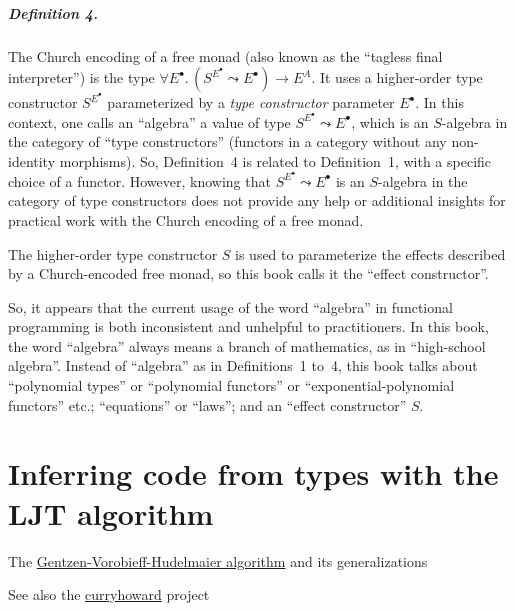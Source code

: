 \paragraph{Definition 4.}

The Church encoding of a free monad (also known as the \textsf{``}tagless
final interpreter\textsf{''}) is the type $\forall E^{\bullet}.\,(S^{E^{\bullet}}\leadsto E^{\bullet})\rightarrow E^{A}$.
It uses a higher-order type constructor $S^{E^{\bullet}}$ parameterized
by a \emph{type constructor} parameter $E^{\bullet}$. In this context,
one calls an \textsf{``}algebra\textsf{''} a value of type $S^{E^{\bullet}}\leadsto E^{\bullet}$,
which is an $S$-algebra in the category of \textsf{``}type constructors\textsf{''}
(functors in a category without any non-identity morphisms). So, Definition~4
is related to Definition~1, with a specific choice of a functor.
However, knowing that $S^{E^{\bullet}}\leadsto E^{\bullet}$ is an
$S$-algebra in the category of type constructors does not provide
any help or additional insights for practical work with the Church
encoding of a free monad.

The higher-order type constructor $S$ is used to parameterize the
effects described by a Church-encoded free monad, so this book calls
it the \textsf{``}effect constructor\textsf{''}.

So, it appears that the current usage of the word \textsf{``}algebra\textsf{''} in
functional programming is both inconsistent and unhelpful to practitioners.
In this book, the word \textsf{``}algebra\textsf{''} always means a branch of mathematics,
as in \textsf{``}high-school algebra\textsf{''}. Instead of \textsf{``}algebra\textsf{''} as in Definitions~1
to~4, this book talks about \textsf{``}polynomial types\textsf{''} or \textsf{``}polynomial
functors\textsf{''} or \textsf{``}exponential-polynomial functors\textsf{''} etc.; \textsf{``}equations\textsf{''}
or \textsf{``}laws\textsf{''}; and an \textsf{``}effect constructor\textsf{''} $S$.

\chapter{Inferring code from types with the LJT algorithm\label{app:CH-correspondence-LJT-algorithm}}

The \href{http://apt13.unibe.ch/slides/Dyckhoff.pdf}{Gentzen-Vorobieff-Hudelmaier algorithm}
and its generalizations

See also the \href{https://github.com/Chymyst/curryhoward}{curryhoward}
project

